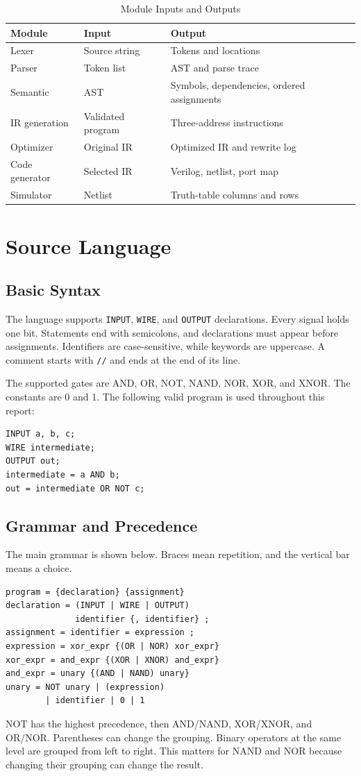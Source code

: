 \documentclass[conference]{IEEEtran}
\newcommand{\code}[1]{\texttt{#1}}
\begin{document}
\begin{table}[ht]
\caption{Module Inputs and Outputs}
\label{tab:contracts}
\centering\small
\begin{tabular}{@{}P{0.22\columnwidth}P{0.28\columnwidth}P{0.43\columnwidth}@{}}
\toprule
Module & Input & Output\\\midrule
Lexer & Source string & Tokens and locations\\
Parser & Token list & AST and parse trace\\
Semantic & AST & Symbols, dependencies, ordered assignments\\
IR generation & Validated program & Three-address instructions\\
Optimizer & Original IR & Optimized IR and rewrite log\\
Code generator & Selected IR & Verilog, netlist, port map\\
Simulator & Netlist & Truth-table columns and rows\\\bottomrule
\end{tabular}
\end{table}

\section{Source Language}
\subsection{Basic Syntax}
The language supports \code{INPUT}, \code{WIRE}, and \code{OUTPUT} declarations. Every signal holds one bit. Statements end with semicolons, and declarations must appear before assignments. Identifiers are case-sensitive, while keywords are uppercase. A comment starts with \code{//} and ends at the end of its line.

The supported gates are AND, OR, NOT, NAND, NOR, XOR, and XNOR. The constants are 0 and 1. The following valid program is used throughout this report:
\begin{lstlisting}
INPUT a, b, c;
WIRE intermediate;
OUTPUT out;
intermediate = a AND b;
out = intermediate OR NOT c;
\end{lstlisting}

\subsection{Grammar and Precedence}
The main grammar is shown below. Braces mean repetition, and the vertical bar means a choice.
\begin{lstlisting}
program = {declaration} {assignment}
declaration = (INPUT | WIRE | OUTPUT)
              identifier {, identifier} ;
assignment = identifier = expression ;
expression = xor_expr {(OR | NOR) xor_expr}
xor_expr = and_expr {(XOR | XNOR) and_expr}
and_expr = unary {(AND | NAND) unary}
unary = NOT unary | (expression)
        | identifier | 0 | 1
\end{lstlisting}
NOT has the highest precedence, then AND/NAND, XOR/XNOR, and OR/NOR. Parentheses can change the grouping. Binary operators at the same level are grouped from left to right. This matters for NAND and NOR because changing their grouping can change the result.
\end{document}
